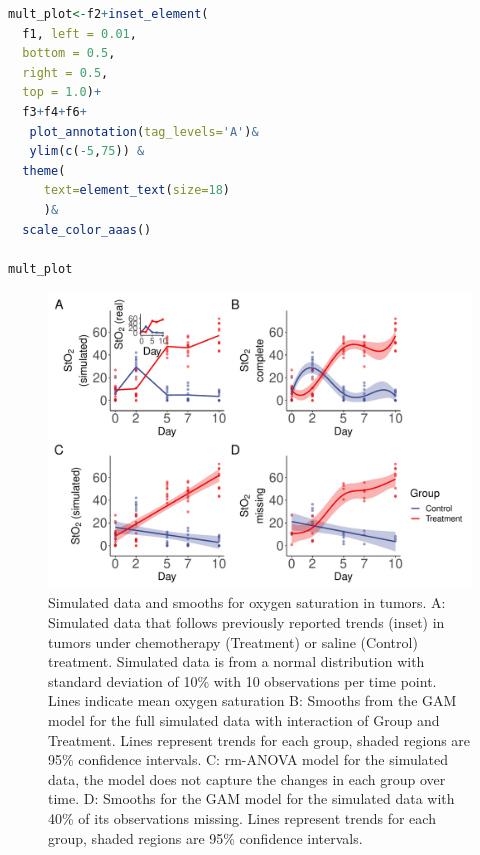 \documentclass[
]{article}
\begin{document}
\begin{lstlisting}[language=R]
mult_plot<-f2+inset_element(
  f1, left = 0.01, 
  bottom = 0.5, 
  right = 0.5, 
  top = 1.0)+
  f3+f4+f6+
   plot_annotation(tag_levels='A')&
   ylim(c(-5,75)) &
  theme(
     text=element_text(size=18)
     )&
  scale_color_aaas()

mult_plot
\end{lstlisting}

\begin{figure}[H]

{\centering \includegraphics[width=0.75\linewidth,]{Full_document_files/figure-latex/sim-smooth-plot-Appendix-1} 

}

\caption{Simulated data and smooths for oxygen saturation in tumors. A: Simulated data that follows previously reported trends (inset) in tumors under chemotherapy (Treatment) or saline (Control) treatment. Simulated data is from a normal distribution with standard deviation of 10\% with 10 observations per time point. Lines indicate mean oxygen saturation B: Smooths from the GAM model for the full simulated data with interaction of Group and Treatment. Lines represent trends for each group, shaded regions are 95\% confidence intervals. C: rm-ANOVA model for the simulated data, the model does not capture the changes in each group over time. D: Smooths for the GAM model for the simulated data with 40\% of its observations missing. Lines represent trends for each group, shaded regions are 95\% confidence intervals.}\label{fig:sim-smooth-plot-Appendix}
\end{figure}
\end{document}
